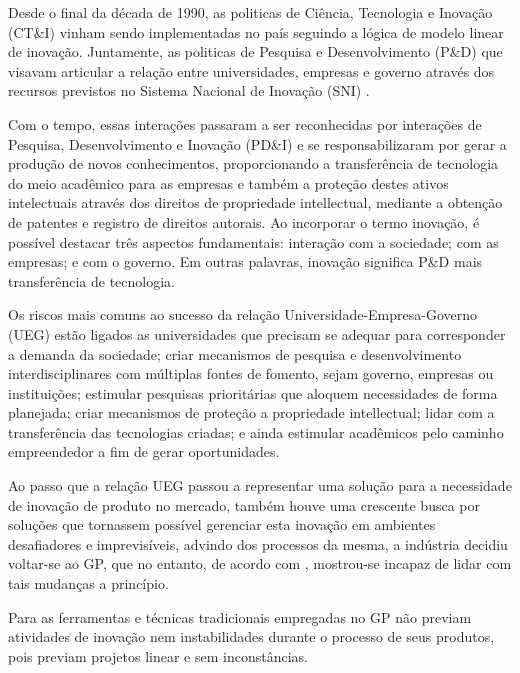 Desde o final da década de 1990, as politicas de Ciência, Tecnologia e Inovação (CT\&I) vinham sendo implementadas no país seguindo a lógica de modelo linear de inovação. Juntamente, as politicas de Pesquisa e Desenvolvimento (P\&D) que visavam articular a relação entre universidades, empresas e governo através dos recursos previstos no Sistema Nacional de Inovação (SNI) \cite{kuhlmann112008logicas}.

Com o tempo, essas interações passaram a ser reconhecidas por interações de Pesquisa, Desenvolvimento e Inovação (PD\&I) e se responsabilizaram por gerar a produção de novos conhecimentos, proporcionando a transferência de tecnologia do meio acadêmico para as empresas e também a proteção destes ativos intelectuais através dos direitos de propriedade intellectual, mediante a obtenção de patentes e registro de direitos autorais. Ao incorporar o termo inovação, é possível destacar três aspectos fundamentais: interação com a sociedade; com as empresas; e com o governo. Em outras palavras, inovação significa P\&D mais transferência de tecnologia.

Os riscos mais comuns ao sucesso da relação Universidade-Empresa-Governo (UEG) estão ligados as universidades que precisam se adequar para corresponder a demanda da sociedade; criar mecanismos de pesquisa e desenvolvimento interdisciplinares com múltiplas fontes de fomento, sejam governo, empresas ou instituições; estimular pesquisas prioritárias que aloquem necessidades de forma planejada; criar mecanismos de proteção a propriedade intellectual; lidar com a transferência das tecnologias criadas; e ainda estimular acadêmicos pelo caminho empreendedor a fim de gerar oportunidades.

Ao passo que a relação UEG passou a representar uma solução para a necessidade de inovação de produto no mercado, também houve uma crescente busca por soluções que tornassem possível gerenciar esta inovação em ambientes desafiadores e imprevisíveis, advindo dos processos da mesma, a indústria decidiu voltar-se ao GP, que no entanto, de acordo com , mostrou-se incapaz de lidar com tais mudanças a princípio.

Para  as ferramentas e técnicas tradicionais empregadas no GP não previam atividades de inovação nem instabilidades durante o processo de seus produtos, pois previam projetos linear e sem inconstâncias.

